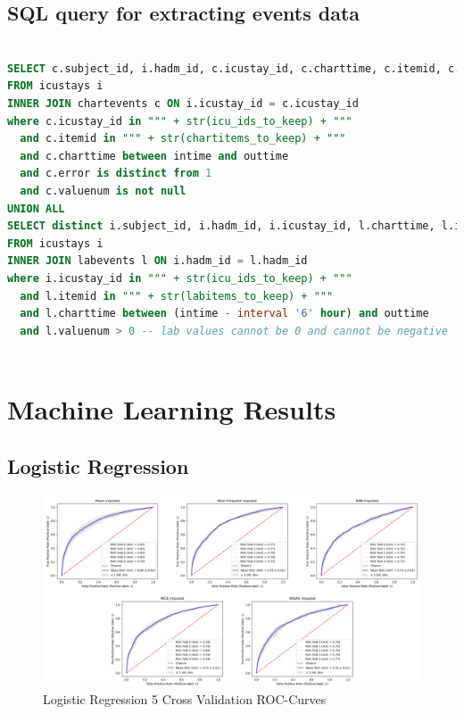 \documentclass{l4proj}
\begin{document}
\begin{appendices}
\begin{lstlisting}[language=SQL]
\end{lstlisting}

\subsection{SQL query for extracting events data}
\label{appendix:eventsSQL}
\begin{lstlisting}[language=SQL]

SELECT c.subject_id, i.hadm_id, c.icustay_id, c.charttime, c.itemid, c.value, c.valueuom
FROM icustays i
INNER JOIN chartevents c ON i.icustay_id = c.icustay_id
where c.icustay_id in """ + str(icu_ids_to_keep) + """
  and c.itemid in """ + str(chartitems_to_keep) + """
  and c.charttime between intime and outtime
  and c.error is distinct from 1
  and c.valuenum is not null
UNION ALL
SELECT distinct i.subject_id, i.hadm_id, i.icustay_id, l.charttime, l.itemid, l.value, l.valueuom
FROM icustays i
INNER JOIN labevents l ON i.hadm_id = l.hadm_id
where i.icustay_id in """ + str(icu_ids_to_keep) + """
  and l.itemid in """ + str(labitems_to_keep) + """
  and l.charttime between (intime - interval '6' hour) and outtime
  and l.valuenum > 0 -- lab values cannot be 0 and cannot be negative
  
\end{lstlisting}


\section{Machine Learning Results}
\subsection{Logistic Regression}
\label{appendix:lgresults}
 \begin{figure}[!h]
  \caption{Logistic Regression 5 Cross Validation ROC-Curves}
  \includegraphics[width=\textwidth]{dissertation/Latex/images/Classification Results/lg_roc.PNG}
\end{figure}


\end{appendices}
\end{document}
